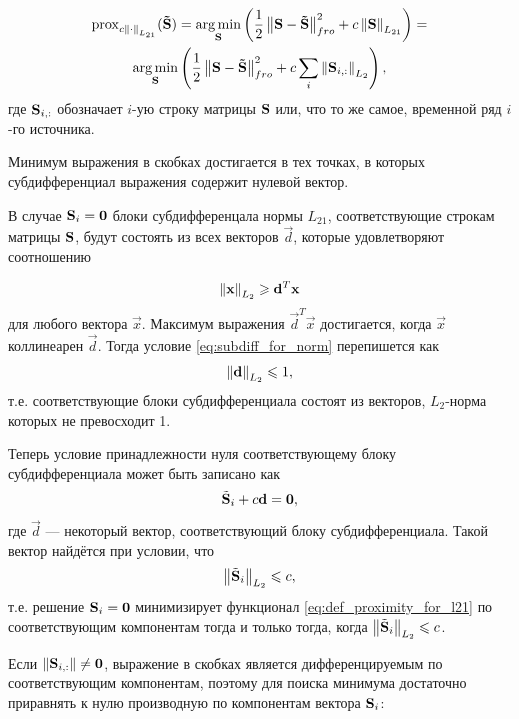 \begin{multline}
    \operatorname{prox}_{c \left\lVert\cdot\right\rVert_{L_{21}}}(\mathbf{\tilde{S}}) =
    \operatorname*{arg\,min}_{\mathbf{S}}\left(\frac{1}{2}\left\lVert\mathbf{S - \tilde{S}}\right\rVert^2_{fro} + c \left\lVert\mathbf{S}\right\rVert_{L_{21}}\right)=\\
    \operatorname*{arg\,min}_{\mathbf{S}}\left(\frac{1}{2}\left\lVert\mathbf{S - \tilde{S}}\right\rVert^2_{fro} + c \sum_i \left\lVert\mathbf{S}_{i,:}\right\rVert_{L_2}\right),
    \label{eq:def_proximity_for_l21}
\end{multline}
где $\mathbf{S}_{i,:}$ обозначает $i$-ую строку матрицы $\mathbf{S}$ или, что то же
самое, временной ряд $i$-го источника.

Минимум выражения в скобках достигается в тех точках, в которых субдифференциал
выражения содержит нулевой вектор.

В случае $\mathbf{S}_i = \mathbf{0}$ блоки субдифференцала нормы $L_{21}$,
соответствующие строкам матрицы $\mathbf{S}$,
будут состоять из всех
векторов $\vec{d}$, которые удовлетворяют соотношению

\begin{equation}
    \left\lVert\mathbf{x}\right\rVert_{L_2} \geqslant \mathbf{d}^T\mathbf{x}
    \label{eq:subdiff_for_norm}
\end{equation}
для любого вектора $\vec{x}$. Максимум выражения $\vec{d}^T\vec{x}$ достигается, когда
$\vec{x}$ коллинеарен $\vec{d}$. Тогда условие \ref{eq:subdiff_for_norm} перепишется
как 
\begin{equation}
    \left\lVert\mathbf{d}\right\rVert_{L_2} \leqslant 1,
\end{equation}
т.е. соответствующие блоки субдифференциала состоят из векторов, $L_2$-норма которых
не превосходит 1.

Теперь условие принадлежности нуля соответствующему блоку субдифференциала может быть записано как
\begin{equation}
    \tilde{\mathbf{S}}_i + c\mathbf{d} = \mathbf{0},
\end{equation}
где $\vec{d}$ --- некоторый вектор, соответствующий блоку субдифференциала.
Такой вектор найдётся при условии, что
\begin{equation}
    \left\lVert\tilde{\mathbf{S}}_i\right\rVert_{L_2} \leqslant c,
\end{equation}
т.е. решение $\mathbf{S}_i = \mathbf{0}$ минимизирует функционал \ref{eq:def_proximity_for_l21} по соответствующим компонентам
тогда и только тогда, когда $\left\lVert\tilde{\mathbf{S}}_i\right\rVert_{L_2} \leqslant c$.

Если $\left\lVert\mathbf{S}_{i,:}\right\rVert \neq \mathbf{0}$, выражение в скобках является дифференцируемым
по соответствующим компонентам, поэтому для поиска минимума достаточно приравнять
к нулю производную по компонентам вектора $\mathbf{S}_i$:

